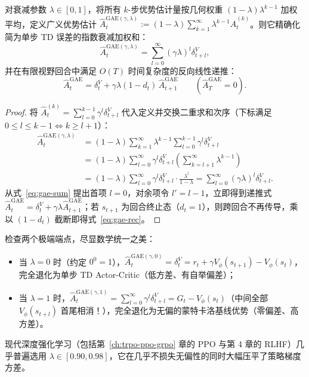 \begin{thmBox}
\begin{theorem}
\label{thm:gae}
对衰减参数 $\lambda \in [0, 1]$，将所有 $k$-步优势估计量按几何权重 $(1-\lambda)\lambda^{k-1}$ 加权平均，定义广义优势估计 $\hat{A}_t^{\mathrm{GAE}(\gamma,\lambda)} := (1 - \lambda)\sum_{k=1}^{\infty} \lambda^{k-1} \hat{A}_t^{(k)}$。则它精确化简为单步 TD 误差的指数衰减加权和：
\begin{equation}
  \hat{A}_t^{\mathrm{GAE}(\gamma,\lambda)} = \sum_{l=0}^{\infty} (\gamma \lambda)^l \delta_{t+l}^V,
  \label{eq:gae-sum}
\end{equation}
并在有限视野回合中满足 $O(T)$ 时间复杂度的反向线性递推：
\begin{equation}
  \hat{A}_t^{\mathrm{GAE}} = \delta_t^V + \gamma \lambda (1 - d_t)\, \hat{A}_{t+1}^{\mathrm{GAE}} \qquad (\hat{A}_T^{\mathrm{GAE}} = 0).
  \label{eq:gae-rec}
\end{equation}
\end{theorem}
\begin{proof}
将 $\hat{A}_t^{(k)} = \sum_{l=0}^{k-1} \gamma^l \delta_{t+l}^V$ 代入定义并交换二重求和次序（下标满足 $0 \le l \le k-1 \iff k \ge l+1$）：
\begin{align*}
  \hat{A}_t^{\mathrm{GAE}(\gamma,\lambda)}
  &= (1 - \lambda) \sum_{k=1}^{\infty} \lambda^{k-1} \sum_{l=0}^{k-1} \gamma^l \delta_{t+l}^V \\
  &= (1 - \lambda) \sum_{l=0}^{\infty} \gamma^l \delta_{t+l}^V \left(\sum_{k=l+1}^{\infty} \lambda^{k-1}\right) \\
  &= (1 - \lambda) \sum_{l=0}^{\infty} \gamma^l \delta_{t+l}^V \cdot \frac{\lambda^l}{1 - \lambda}
   = \sum_{l=0}^{\infty} (\gamma \lambda)^l \delta_{t+l}^V.
\end{align*}
从式~\eqref{eq:gae-sum} 提出首项 $l=0$，对余项令 $l' = l - 1$，立即得到递推式 $\hat{A}_t^{\mathrm{GAE}} = \delta_t^V + \gamma\lambda \hat{A}_{t+1}^{\mathrm{GAE}}$；若 $s_{t+1}$ 为回合终止态（$d_t = 1$），则跨回合不再传导，乘以 $(1 - d_t)$ 截断即得式~\eqref{eq:gae-rec}。
\end{proof}
\end{thmBox}

检查两个极端端点，尽显数学统一之美：
\begin{itemize}
  \item 当 $\lambda = 0$ 时（约定 $0^0 = 1$），$\hat{A}_t^{\mathrm{GAE}(\gamma, 0)} = \delta_t^V = r_t + \gamma V_\phi(s_{t+1}) - V_\phi(s_t)$，完全退化为单步 TD Actor-Critic（低方差、有自举偏差）；
  \item 当 $\lambda = 1$ 时，$\hat{A}_t^{\mathrm{GAE}(\gamma, 1)} = \sum_{l=0}^{\infty} \gamma^l \delta_{t+l}^V = G_t - V_\phi(s_t)$（中间全部 $V_\phi(s_{t+l})$ 首尾相消！），完全退化为无偏的蒙特卡洛基线优势（零偏差、高方差）。
\end{itemize}
现代深度强化学习（包括第~\ref{ch:trpo-ppo-grpo} 章的 PPO 与第 4 章的 RLHF）几乎普遍选用 $\lambda \in [0.90, 0.98]$，它在几乎不损失无偏性的同时大幅压平了策略梯度方差。

